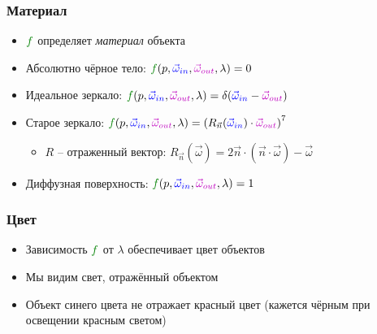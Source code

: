 \documentclass{beamer}
\begin{document}
\begin{frame}[fragile]
\frametitle{Материал}
\begin{itemize}
\item \begin{math}{\color{green}f}\end{math} определяет \textit{материал} объекта
\pause 
\item Абсолютно чёрное тело: \begin{math}{\color{green}f}(p, {\color{blue}\vec\omega_{in}}, {\color{magenta}\vec\omega_{out}}, \lambda) = 0\end{math}
\pause
\item Идеальное зеркало: \begin{math}{\color{green}f}(p, {\color{blue}\vec\omega_{in}}, {\color{magenta}\vec\omega_{out}}, \lambda) = \delta({\color{blue}\vec\omega_{in}} - {\color{magenta}\vec\omega_{out}})\end{math}
\pause
\item Старое зеркало: \begin{math}{\color{green}f}(p, {\color{blue}\vec\omega_{in}}, {\color{magenta}\vec\omega_{out}}, \lambda) = \left(R_{\vec n}({\color{blue}\vec\omega_{in}})\cdot{\color{magenta}\vec\omega_{out}}\right)^7\end{math}
\begin{itemize}
\item \begin{math}R\end{math} -- отраженный вектор: \begin{math}R_{\vec n}(\vec \omega) = 2\vec n \cdot (\vec n \cdot \vec \omega) - \vec \omega\end{math}
\end{itemize}
\pause
\item Диффузная поверхность: \begin{math}{\color{green}f}(p, {\color{blue}\vec\omega_{in}}, {\color{magenta}\vec\omega_{out}}, \lambda) = 1\end{math}
\end{itemize}
\end{frame}

\begin{frame}[fragile]
\frametitle{Цвет}
\begin{itemize}
\item Зависимость \begin{math}{\color{green}f}\end{math} от \begin{math}\lambda\end{math} обеспечивает цвет объектов
\pause
\item Мы видим свет, отражённый объектом
\item Объект синего цвета не отражает красный цвет (кажется чёрным при освещении красным светом)
\end{itemize}
\end{frame}
\end{document}
